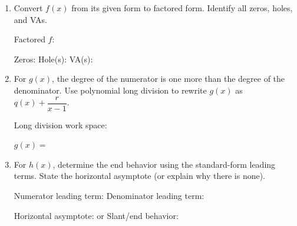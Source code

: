 \documentclass[10pt]{article}
\begin{document}
\begin{tcolorbox}[colback=white, colframe=black!40,
    title=\textbf{Tier A --- Apply},
    fonttitle=\bfseries, arc=2mm, left=3mm, right=3mm, top=2mm, bottom=2mm]

\begin{enumerate}[itemsep=10pt]
  \item Convert $f(x)$ from its given form to factored form. Identify all zeros, holes, and VAs.

        \vspace{0.06in}
        Factored $f$: \blank{7cm}

        Zeros: \blank{3cm} \quad Hole(s): \blank{3cm} \quad VA(s): \blank{3cm}

  \item For $g(x)$, the degree of the numerator is one more than the degree of the denominator.
        Use polynomial long division to rewrite $g(x)$ as $q(x) + \dfrac{r}{x-1}$.

        \vspace{0.06in}
        Long division work space:

        \vspace{0.5in}

        $g(x) = $ \blank{8cm}

  \item For $h(x)$, determine the end behavior using the standard-form leading terms. State the
        horizontal asymptote (or explain why there is none).

        \vspace{0.06in}
        Numerator leading term: \blank{2.5cm} \quad Denominator leading term: \blank{2.5cm}

        \vspace{0.04in}
        Horizontal asymptote: \blank{4cm} \quad or \quad Slant/end behavior: \blank{4cm}
\end{enumerate}
\end{tcolorbox}

\vspace{0.1in}
\end{document}
